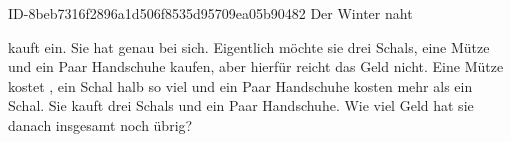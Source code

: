\begin{exercise}
      {ID-8beb7316f2896a1d506f8535d95709ea05b90482}
      {Der Winter naht}
  \ifproblem\problem\par
    \xxa{} kauft ein. Sie hat genau  bei sich. Eigentlich möchte sie
    drei Schals, eine Mütze und ein Paar Handschuhe kaufen, aber hierfür
    reicht das Geld nicht. Eine Mütze kostet , ein Schal halb so
    viel und ein Paar Handschuhe kosten  mehr als ein Schal. Sie kauft
    drei Schals und ein Paar Handschuhe. Wie viel Geld hat sie danach insgesamt
    noch übrig?
  \fi
\end{exercise}
